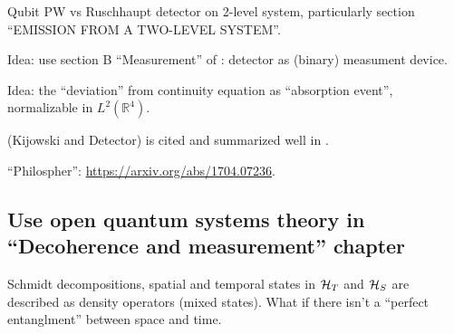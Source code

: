 Qubit PW vs Ruschhaupt detector on 2-level system,
particularly section “EMISSION FROM A TWO-LEVEL SYSTEM”.

Idea: use section B ``Measurement'' of \cite{Lloyd:Time}: detector as (binary) measument device.

Idea: the ``deviation'' from continuity equation as ``absorption event'',
normalizable in $L^2(\mathbb{R}^4)$.

\cite{TQM2} (Kijowski and Detector) is cited and summarized well in
\cite{Halliwell_Detector}.

``Philospher'': \url{https://arxiv.org/abs/1704.07236}.

\subsection{Use open quantum systems theory in ``Decoherence and measurement'' chapter}
Schmidt decompositions, spatial and temporal states in
$\mathcal{H}_T$ and $\mathcal{H}_S$
are described as density operators
(mixed states). What if there isn't a ``perfect entanglment'' between space and time.
